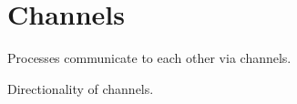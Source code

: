 
\chapter{Channels}
\label{sec:channels}

Processes communicate to each other via channels.  

Directionality of channels.  

